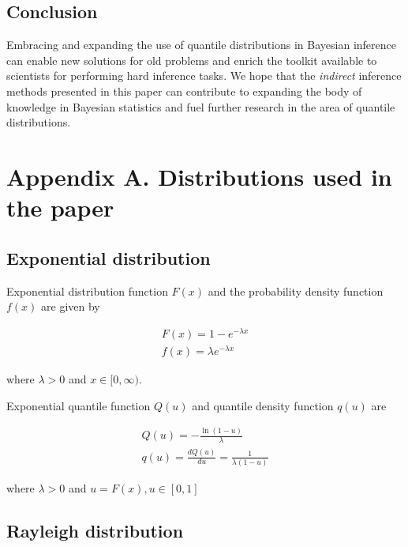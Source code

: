 \documentclass[
  12pt,
]{article}
\begin{document}
\hypertarget{conclusion}{%
\subsection{Conclusion}\label{conclusion}}

Embracing and expanding the use of quantile distributions in Bayesian inference can enable new solutions for old problems and enrich the toolkit available to scientists for performing hard inference tasks. We hope that the \emph{indirect} inference methods presented in this paper can contribute to expanding the body of knowledge in Bayesian statistics and fuel further research in the area of quantile distributions.

\hypertarget{appendix-a.-distributions-used-in-the-paper}{%
\section{Appendix A. Distributions used in the paper}\label{appendix-a.-distributions-used-in-the-paper}}

\hypertarget{exponential-distribution}{%
\subsection{Exponential distribution}\label{exponential-distribution}}

Exponential distribution function \(F(x)\) and the probability density function \(f(x)\) are given by

\[
\begin{gathered}
F(x)=1-e^{-\lambda x} \\ 
f(x)=\lambda e^{-\lambda x}
\end{gathered}
\]

where \(\lambda>0\) and \(x\in[0,\infty)\).

Exponential quantile function \(Q(u)\) and quantile density function \(q(u)\) are

\[
\begin{gathered}
Q(u)=-\frac{\ln(1-u)}{\lambda}\\ 
q(u)=\frac{dQ(u)}{du}=\frac{1}{\lambda(1-u)}
\end{gathered}
\]

where \(\lambda>0\) and \(u=F(x), u \in [0,1]\)

\hypertarget{rayleigh-distribution}{%
\subsection{Rayleigh distribution}\label{rayleigh-distribution}}
\end{document}
